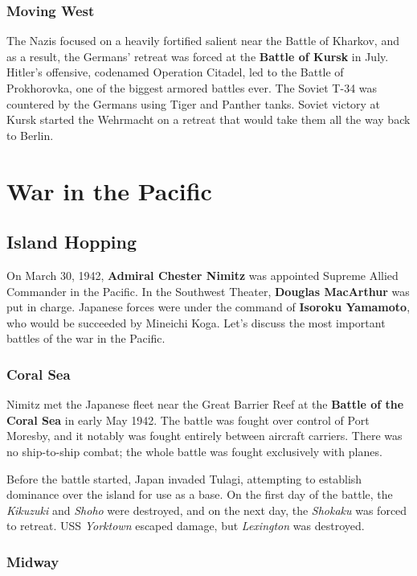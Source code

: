 \subsubsection*{Moving West}

The Nazis focused on a heavily fortified salient near the Battle of Kharkov,
and as a result, the Germans' retreat was forced at the \textbf{Battle of Kursk} in July.
Hitler's offensive, codenamed Operation Citadel,
led to the Battle of Prokhorovka, one of the biggest armored battles ever.
The Soviet T-34 was countered by the Germans using Tiger and Panther tanks.
Soviet victory at Kursk started the Wehrmacht on a retreat
that would take them all the way back to Berlin.

\section{War in the Pacific}

\subsection*{Island Hopping}

On March 30, 1942,
\textbf{Admiral Chester Nimitz} was appointed Supreme Allied Commander in the Pacific.
In the Southwest Theater, \textbf{Douglas MacArthur} was put in charge.
Japanese forces were under the command of \textbf{Isoroku Yamamoto},
who would be succeeded by Mineichi Koga.
Let's discuss the most important battles of the war in the Pacific.

\subsubsection*{Coral Sea}

Nimitz met the Japanese fleet near the Great Barrier Reef at the \textbf{Battle of the Coral Sea}
in early May 1942.
The battle was fought over control of Port Moresby,
and it notably was fought entirely between aircraft carriers.
There was no ship-to-ship combat; the whole battle was fought exclusively with planes.

Before the battle started, Japan invaded Tulagi,
attempting to establish dominance over the island for use as a base.
On the first day of the battle, the \textit{Kikuzuki} and \textit{Shoho} were destroyed,
and on the next day, the \textit{Shokaku} was forced to retreat.
USS \textit{Yorktown} escaped damage, but \textit{Lexington} was destroyed.

\subsubsection*{Midway}

